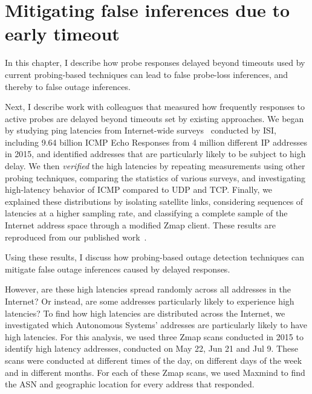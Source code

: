 
\chapter{Mitigating false inferences due to early timeout}
\label{cpt:timeouts}

In this chapter, I describe how probe responses delayed beyond
timeouts used by current probing-based techniques can lead to false
probe-loss inferences, and thereby to false outage inferences. 

Next, I describe work with colleagues that measured how frequently responses
to active probes are delayed beyond timeouts set by existing
approaches. We began by studying ping latencies from Internet-wide surveys~\cite{census-survey} conducted by ISI,
including 9.64 billion ICMP Echo Responses from 4 million different IP
addresses in 2015, and identified addresses that are particularly likely
to be subject to high delay.  We then \emph{verified} the high latencies
by repeating measurements using other probing techniques, comparing the
statistics of various surveys, and investigating high-latency
behavior of ICMP compared to UDP and TCP.  Finally, we
explained these distributions by isolating satellite links,
considering sequences of latencies at a higher sampling rate,
and classifying a complete sample of the Internet address
space through a modified Zmap client. These results are reproduced
from our published work~\cite{timeouts}.

Using these results, I discuss how probing-based outage
detection techniques can mitigate false outage inferences caused by
delayed responses.



However, are these high latencies spread randomly across all addresses
in the Internet? Or instead, are some addresses particularly likely to
experience high latencies?
To find how high latencies are distributed across the Internet, we
investigated which Autonomous Systems' addresses are particularly
likely to have high latencies. For this analysis, we used three Zmap
scans conducted in 2015 to identify high latency addresses, conducted
on May 22, Jun 21 and Jul 9. These scans were conducted at different
times of the day, on different days of the week and in different
months. For each of these Zmap scans, we used Maxmind to find the ASN
and geographic location for every address that responded.

